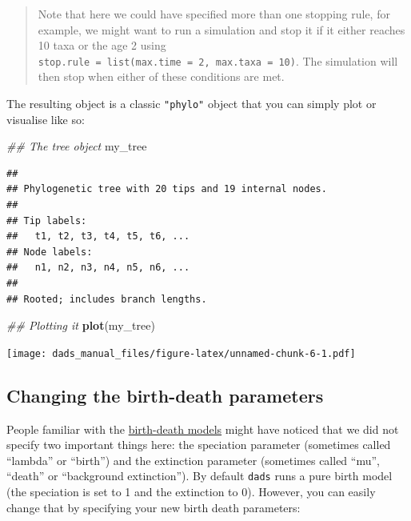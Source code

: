 \documentclass[]{book}
\newenvironment{Shaded}{\begin{snugshade}}{\end{snugshade}}
\newcommand{\CommentTok}[1]{\textcolor[rgb]{0.56,0.35,0.01}{\textit{#1}}}
\newcommand{\KeywordTok}[1]{\textcolor[rgb]{0.13,0.29,0.53}{\textbf{#1}}}
\newcommand{\NormalTok}[1]{#1}
\begin{document}
\begin{quote}
Note that here we could have specified more than one stopping rule, for example, we might want to run a simulation and stop it if it either reaches 10 taxa or the age 2 using \texttt{stop.rule\ =\ list(max.time\ =\ 2,\ max.taxa\ =\ 10)}. The simulation will then stop when either of these conditions are met.
\end{quote}

The resulting object is a classic \texttt{"phylo"} object that you can simply plot or visualise like so:

\begin{Shaded}
\begin{Highlighting}[]
\CommentTok{## The tree object}
\NormalTok{my_tree}
\end{Highlighting}
\end{Shaded}

\begin{verbatim}
## 
## Phylogenetic tree with 20 tips and 19 internal nodes.
## 
## Tip labels:
##   t1, t2, t3, t4, t5, t6, ...
## Node labels:
##   n1, n2, n3, n4, n5, n6, ...
## 
## Rooted; includes branch lengths.
\end{verbatim}

\begin{Shaded}
\begin{Highlighting}[]
\CommentTok{## Plotting it}
\KeywordTok{plot}\NormalTok{(my_tree)}
\end{Highlighting}
\end{Shaded}

\texttt{[image: dads\_manual\_files/figure-latex/unnamed-chunk-6-1.pdf]}

\hypertarget{changing-the-birth-death-parameters}{%
\subsection{Changing the birth-death parameters}\label{changing-the-birth-death-parameters}}

People familiar with the \href{https://lukejharmon.github.io/pcm/chapter10_birthdeath/}{birth-death models} might have noticed that we did not specify two important things here: the speciation parameter (sometimes called ``lambda'' or ``birth'') and the extinction parameter (sometimes called ``mu'', ``death'' or ``background extinction'').
By default \texttt{dads} runs a pure birth model (the speciation is set to 1 and the extinction to 0).
However, you can easily change that by specifying your new birth death parameters:
\end{document}
